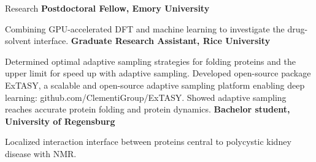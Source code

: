 \begin{rubric}{Research}
\entry*[2020 -- present]%
	\textbf{Postdoctoral Fellow, Emory University}
  \par Combining GPU-accelerated DFT and machine learning to investigate the drug-solvent interface. 
\entry*[2014 -- 2020]%
  \textbf{Graduate Research Assistant, Rice University}
  \par Determined optimal adaptive sampling strategies for folding proteins and the upper limit for speed up with adaptive sampling. Developed open-source package ExTASY, a scalable and open-source adaptive sampling platform enabling deep learning: github.com/ClementiGroup/ExTASY. Showed adaptive sampling reaches accurate protein folding and protein dynamics.
\entry*[2012]%
  \textbf{Bachelor student, University of Regensburg}
  \par Localized interaction interface between proteins central to polycystic kidney disease with NMR.
\end{rubric}

